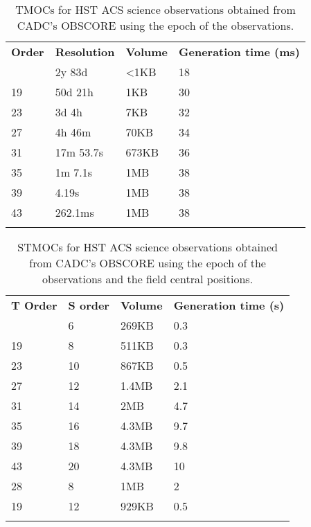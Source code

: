 \begin{table}[!htbp]
\begin{center}
{\scriptsize
\begin{tabular}{p{}p{}p{}p{}}
\sptablerule
\textbf{Order} & \textbf{Resolution} & \textbf{Volume} & \textbf{Generation \newline time (ms)}\\
\sptablerule
15&	2y 83d&	<1KB&	18 \\
19&	50d 21h	&1KB&	30 \\
23&	3d 4h&	7KB&	32 \\
27&	4h 46m&	70KB&	34 \\
31&	17m 53.7s&	673KB&	36 \\
35&	1m 7.1s&	1MB&	38 \\
39&	4.19s&	1MB&	38 \\
43&	262.1ms&	1MB&	38 \\
\sptablerule
\end{tabular}
\caption[TMOC performances]{TMOCs for HST ACS science observations obtained from CADC's OBSCORE using the epoch of the observations.}
\normalsize
\label{table:tmocsizeacs}
}
\end{center}
\end{table}


\begin{table}[!htbp]
\begin{center}
{\scriptsize
\begin{tabular}{p{}p{}p{}p{}}
\sptablerule
\textbf{T Order} & \textbf{S order} & \textbf{Volume} & \textbf{Generation \newline time (s)}\\
\sptablerule
15&	6&	269KB&	0.3\\
19&	8&	511KB&	0.3\\
23&	10&	867KB&	0.5\\
27&	12&	1.4MB&	2.1\\
31&	14&	2MB&	4.7\\
35&	16&	4.3MB&	9.7\\
39&	18&	4.3MB&	9.8\\
43&	20&	4.3MB&	10\\
28&	8&	1MB&	2\\
19&	12&	929KB&	0.5\\
\sptablerule
\end{tabular}
\caption[STMOC performances]{STMOCs for HST ACS science observations obtained from CADC's OBSCORE using the epoch of the observations and the field central positions.}
\normalsize
\label{table:stmocsizeacs}
}
\end{center}
\end{table}


